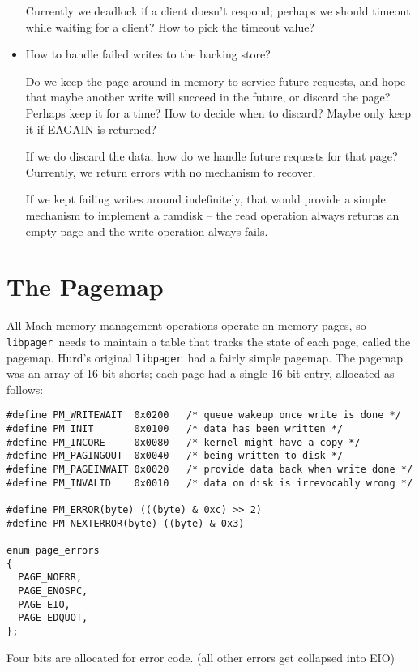 \documentclass{article}
\def\libpager{{\tt libpager\ }}
\begin{document}
\begin{itemize}
  Currently we deadlock if a client doesn't respond; perhaps we should
  timeout while waiting for a client?  How to pick the timeout value?

\item How to handle failed writes to the backing store?

  Do we keep the page around in memory to service future requests, and
  hope that maybe another write will succeed in the future, or discard
  the page?  Perhaps keep it for a time?  How to decide when to
  discard?  Maybe only keep it if EAGAIN is returned?

  If we do discard the data, how do we handle future requests for that
  page?  Currently, we return errors with no mechanism to recover.

  If we kept failing writes around indefinitely, that would provide a
  simple mechanism to implement a ramdisk -- the read operation always
  returns an empty page and the write operation always fails.

\end{itemize}


\section{The Pagemap}

All Mach memory management operations operate on memory pages, so
\libpager needs to maintain a table that tracks the state of each
page, called the pagemap.  Hurd's original \libpager had a fairly
simple pagemap.  The pagemap was an array of 16-bit shorts; each page
had a single 16-bit entry, allocated as follows:

\begin{verbatim}
#define PM_WRITEWAIT  0x0200   /* queue wakeup once write is done */
#define PM_INIT       0x0100   /* data has been written */
#define PM_INCORE     0x0080   /* kernel might have a copy */
#define PM_PAGINGOUT  0x0040   /* being written to disk */
#define PM_PAGEINWAIT 0x0020   /* provide data back when write done */
#define PM_INVALID    0x0010   /* data on disk is irrevocably wrong */

#define PM_ERROR(byte) (((byte) & 0xc) >> 2)
#define PM_NEXTERROR(byte) ((byte) & 0x3)

enum page_errors
{
  PAGE_NOERR,
  PAGE_ENOSPC,
  PAGE_EIO,
  PAGE_EDQUOT,
};
\end{verbatim}

Four bits are allocated for error code.  (all other errors get collapsed into EIO)
\end{document}
